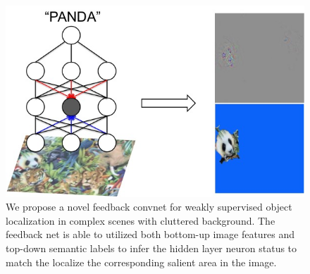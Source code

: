 \setlength{\tabcolsep}{2pt}
\begin{figure}[htb]
\begin{center}
\includegraphics[width=0.95\columnwidth]{figs/splash/splash}
\caption{We propose a novel feedback convnet for weakly supervised object localization in complex scenes with cluttered background. The feedback net is able to utilized both bottom-up image features and top-down semantic labels to infer the hidden layer neuron status to match the localize the corresponding salient area in the image. }
\label{fig:splash0}
\vspace{-10pt}
\end{center}
\end{figure}

